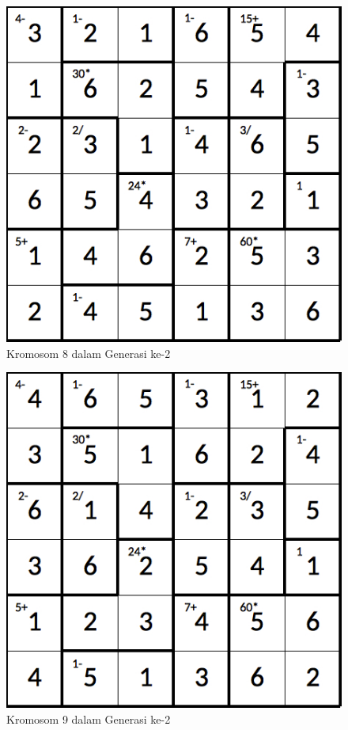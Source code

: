 \documentclass[a4paper,twoside]{article}
\begin{document}
\begin{enumerate}
\begin{figure}
\centering
\captionsetup{justification=centering}
\includegraphics[scale=0.333]{Gambar/hybridgenetic/Generation2Chromosome8}
\caption[Kromosom 8 dalam Generasi ke-2]{Kromosom 8 dalam Generasi ke-2}
\label{fig:analisisg2k8}
\end{figure}

\begin{figure}
\centering
\captionsetup{justification=centering}
\includegraphics[scale=0.333]{Gambar/hybridgenetic/Generation2Chromosome9}
\caption[Kromosom 9 dalam Generasi ke-2]{Kromosom 9 dalam Generasi ke-2}
\label{fig:analisisg2k9}
\end{figure}


\end{enumerate}
\end{document}
